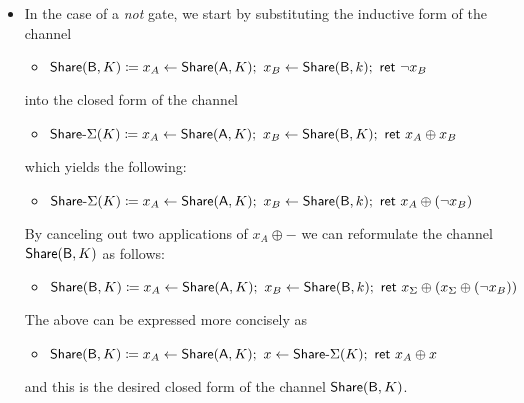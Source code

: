 \begin{itemize}
\item In the case of a \emph{not} gate, we start by substituting the inductive form of the channel
\begin{itemize}
\item $\mathsf{Share}(\mathsf{B},K) \coloneqq x_A \leftarrow \mathsf{Share}(\mathsf{A},K); \ x_B \leftarrow \mathsf{Share}(\mathsf{B},k); \ \mathsf{ret} \ \neg x_B$
\end{itemize}
into the closed form of the channel
\begin{itemize}
\item $\mathsf{Share}\textsf{-}\Sigma(K) \coloneqq x_A \leftarrow \mathsf{Share}(\mathsf{A},K); \ x_B \leftarrow \mathsf{Share}(\mathsf{B},K); \ \mathsf{ret} \ x_A \oplus x_B$
\end{itemize}
which yields the following:
\begin{itemize}
\item $\mathsf{Share}\textsf{-}\Sigma(K) \coloneqq x_A \leftarrow \mathsf{Share}(\mathsf{A},K); \ x_B \leftarrow \mathsf{Share}(\mathsf{B},k); \ \mathsf{ret} \ x_A \oplus (\neg x_B)$
\end{itemize}
By canceling out two applications of $x_A \oplus -$ we can reformulate the channel $\mathsf{Share}(\mathsf{B},K)$ as follows:
\begin{itemize}
\item $\mathsf{Share}(\mathsf{B},K) \coloneqq x_A \leftarrow \mathsf{Share}(\mathsf{A},K); \ x_B \leftarrow \mathsf{Share}(\mathsf{B},k); \ \mathsf{ret} \ x_\Sigma \oplus (x_\Sigma \oplus (\neg x_B))$
\end{itemize}
The above can be expressed more concisely as
\begin{itemize}
\item $\mathsf{Share}(\mathsf{B},K) \coloneqq x_A \leftarrow \mathsf{Share}(\mathsf{A},K); \ x \leftarrow \mathsf{Share}\textsf{-}\Sigma(K); \ \mathsf{ret} \ x_A \oplus x$
\end{itemize}
and this is the desired closed form of the channel $\mathsf{Share}(\mathsf{B},K)$.


\end{itemize}
